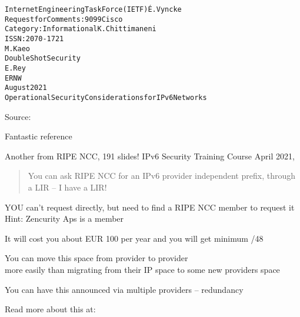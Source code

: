 \documentclass[Screen16to9,17pt]{foils}
\begin{document}

\begin{alltt}\small
Internet Engineering Task Force (IETF)                         É. Vyncke
Request for Comments: 9099                                         Cisco
Category: Informational                                  K. Chittimaneni
ISSN: 2070-1721
                                                                 M. Kaeo
                                                    Double Shot Security
                                                                  E. Rey
                                                                    ERNW
                                                             August 2021
         Operational Security Considerations for IPv6 Networks
\end{alltt}
Source: 

\begin{list2}
\item Fantastic reference
\item Another from RIPE NCC, 191 slides! IPv6 Security Training Course April 2021,\\
\end{list2}




\begin{quote}
You can ask RIPE NCC for an IPv6 provider independent prefix, through a LIR -- I have a LIR!
\end{quote}

\begin{list2}
\item YOU can't request directly, but need to find a RIPE NCC member to request it\\
Hint: Zencurity Aps is a member
\item It will cost you about EUR 100 per year and you will get minimum /48
\item You can move this space from provider to provider\\
more easily than migrating from their IP space to some new providers space
\item You can have this announced via multiple providers -- redundancy
\item Read more about this at:\\
\end{list2}
\end{document}
